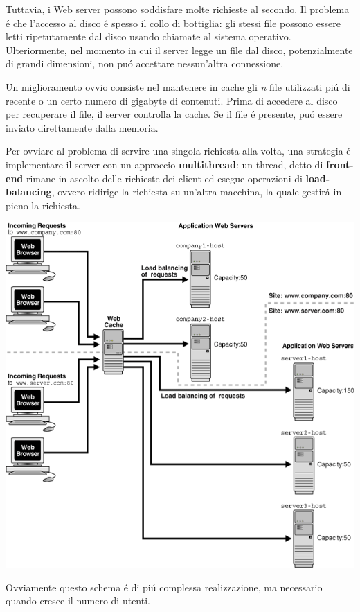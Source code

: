 \documentclass[12pt]{article}
\begin{document}
Tuttavia, i Web server possono soddisfare molte richieste al secondo. Il problema \'e che l'accesso al disco \'e spesso il collo 
di bottiglia: gli stessi file possono essere letti ripetutamente dal disco usando chiamate al sistema operativo. Ulteriormente, nel momento in cui il server legge un file dal disco, potenzialmente di grandi dimensioni, non pu\'o accettare nessun'altra connessione.

Un miglioramento ovvio consiste nel mantenere in cache gli \textit{n} file utilizzati pi\'u di recente o un certo 
numero di gigabyte di contenuti. Prima di accedere al disco per recuperare il file, il server controlla la cache. Se il file \'e 
presente, pu\'o essere inviato direttamente dalla memoria. 

Per ovviare al problema di servire una singola richiesta alla volta, una strategia \'e implementare il server con un approccio 
\textbf{multithread}: un thread, detto di \textbf{front-end} rimane in ascolto delle richieste dei client ed esegue operazioni di 
\textbf{load-balancing}, ovvero ridirige la richiesta su un'altra macchina, la quale gestir\'a in pieno la richiesta.
\begin{center}
    \includegraphics[scale=0.55]{applicazione-img7.png}
\end{center}
Ovviamente questo schema \'e di pi\'u complessa realizzazione, ma necessario quando cresce il numero di utenti.
\end{document}
